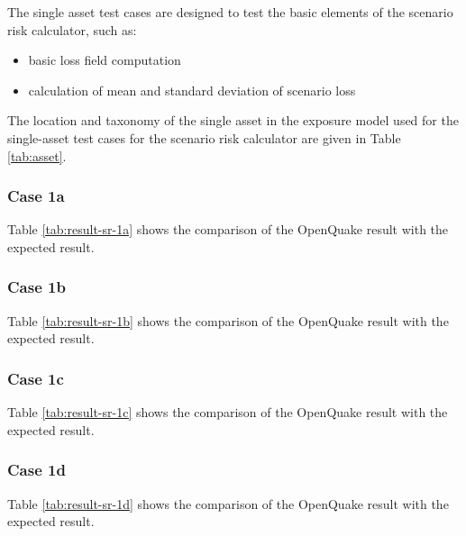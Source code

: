 The single asset test cases are designed to test the basic elements of the scenario risk calculator, such as:

\begin{itemize}
\item basic loss field computation
\item calculation of mean and standard deviation of scenario loss
\end{itemize}



The location and taxonomy of the single asset in the exposure model used for the single-asset test cases for the scenario risk calculator are given in Table \ref{tab:asset}.

\subsubsection{Case 1a}


Table \ref{tab:result-sr-1a} shows the comparison of the OpenQuake result with the expected result.

\subsubsection{Case 1b}


Table \ref{tab:result-sr-1b} shows the comparison of the OpenQuake result with the expected result.

\subsubsection{Case 1c}


Table \ref{tab:result-sr-1c} shows the comparison of the OpenQuake result with the expected result.

\subsubsection{Case 1d}


Table \ref{tab:result-sr-1d} shows the comparison of the OpenQuake result with the expected result.

